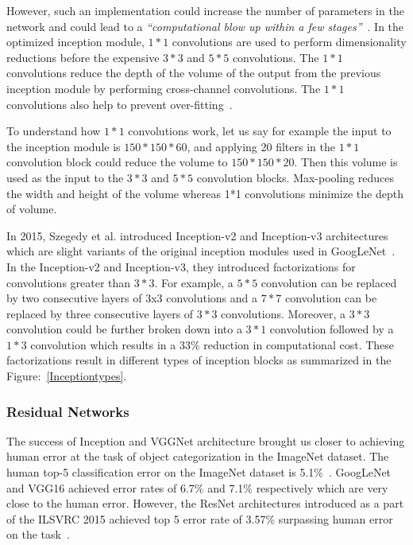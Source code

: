 However, such an implementation could increase the number of parameters in the network and could lead to a \textit{``computational blow up within a few stages''}~\cite{GoogleNet}. In the optimized inception module, $1*1$ convolutions are used to perform dimensionality reductions before the expensive $3*3$ and $5*5$ convolutions. The $1*1$ convolutions reduce the depth of the volume of the output from the previous inception module by performing cross-channel convolutions. The $1*1$ convolutions also help to prevent over-fitting~\cite{NIN}. 

To understand how $1*1$ convolutions work, let us say for example the input to the inception module is $150*150*60$, and applying 20 filters in the $1*1$ convolution block could reduce the volume to $150*150*20$. Then this volume is used as the input to the $3*3$ and $5*5$ convolution blocks. Max-pooling reduces the width and height of the volume whereas 1*1 convolutions minimize the depth of volume. 

In 2015, Szegedy et al. introduced Inception-v2 and Inception-v3 architectures which are slight variants of the original inception modules used in GoogLeNet~\cite{Inception-v3}. In the Inception-v2 and Inception-v3, they introduced factorizations for convolutions greater than $3*3$. For example, a $5*5$ convolution can be replaced by two consecutive layers of 3x3 convolutions and a $7*7$ convolution can be replaced by three consecutive layers of $3*3$ convolutions. Moreover, a $3*3$ convolution could be further broken down into a $3*1$ convolution followed by a $1*3$ convolution which results in a 33\% reduction in computational cost. These factorizations result in different types of inception blocks as summarized in the Figure:~\ref{Inceptiontypes}.

\subsubsection{Residual Networks}

The success of Inception and VGGNet architecture brought us closer to achieving human error at the task of object categorization in the ImageNet dataset. The human top-5 classification error on the ImageNet dataset is 5.1\%~\cite{ImageNETChallenge}. GoogLeNet and VGG16 achieved error rates of 6.7\% and 7.1\% respectively which are very close to the human error. However, the ResNet architectures introduced as a part of the ILSVRC 2015 achieved top 5 error rate of  3.57\% surpassing human error on the task~\cite{ResNet}.


